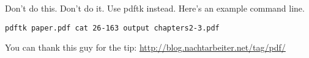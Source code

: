 \documentclass{article}
\begin{document}
Don't do this. Don't do it. Use pdftk instead. Here's an example command line.
\begin{verbatim}
pdftk paper.pdf cat 26-163 output chapters2-3.pdf
\end{verbatim}
You can thank this guy for the tip:
\url{http://blog.nachtarbeiter.net/tag/pdf/}
\end{document}
